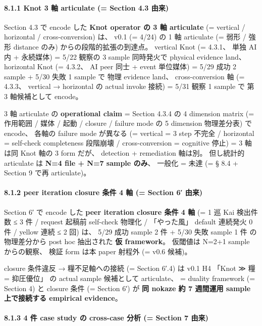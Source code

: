 \documentclass[
]{article}
\begin{document}
\paragraph{8.1.1 Knot 3 軸 articulate (= Section 4.3
由来)}\label{knot-3-ux8ef8-articulate-section-4.3-ux7531ux6765}

Section 4.3 で encode した \textbf{Knot operator の 3 軸 articulate} (=
vertical / horizontal / cross-conversion) は、 v0.1 (= 4/24) の 1 軸
articulate (= 弱形 / 強形 distance のみ) からの段階的拡張の到達点。
vertical Knot (= 4.3.1、 単独 AI 内 + 永続媒体) = 5/22 観察の 3 sample
同時発火で physical evidence land、 horizontal Knot (= 4.3.2、 AI peer
同士 + event 単位媒体) = 5/29 成功 2 sample + 5/30 失敗 1 sample で 物理
evidence land、 cross-conversion 軸 (= 4.3.3、 vertical → horizontal の
actual invoke 接続) = 5/31 観察 1 sample で 第 3 軸候補として encode。

3 軸 articulate の \textbf{operational claim} = Section 4.3.4 の 4
dimension matrix (= 作用範囲 / 媒体 / 起動 / closure / failure mode の 5
dimension 物理差分表) で encode、 各軸の failure mode が異なる (=
vertical = 3 step 不完全 / horizontal = self-check completeness 段階崩壊
/ cross-conversion = cognitive 停止) = 3 軸は同 Knot 軸の 3 form だが、
detection + remediation 軸は別。 但し統計的 articulate は \textbf{N=4
file + N=7 sample のみ}、 一般化 = 未達 (= § 8.4 + Section 9 で再
articulate)。

\paragraph{8.1.2 peer iteration closure 条件 4 軸 (= Section 6′
由来)}\label{peer-iteration-closure-ux6761ux4ef6-4-ux8ef8-section-6-ux7531ux6765}

Section 6′ で encode した \textbf{peer iteration closure 条件 4 軸} (= 1
巡 Kai 検出件数 ≤ 3 件 / request 起稿前 self-check 物理化 / 「やった風」
default 連続発火 0 件 / yellow 連続 ≤ 2 回) は、 5/29 成功 sample 2 件 +
5/30 失敗 sample 1 件 の物理差分から post hoc 抽出された \textbf{仮
framework}。 仮閾値は N=2+1 sample からの観察、 検証 form は本 paper
射程外 (= v0.6 候補)。

closure 条件違反 → 糧不足軸への接続 (= Section 6′.4) は v0.1 H4 「Knot ≫
糧 = 抑圧優位」 の actual sample 候補として articulate、 = duality
framework (= Section 4) と closure 条件 (= Section 6′) が \textbf{同
nokaze 約 7 週間運用 sample 上で接続する empirical evidence}。

\paragraph{8.1.3 4 件 case study の cross-case 分析 (= Section 7
由来)}\label{ux4ef6-case-study-ux306e-cross-case-ux5206ux6790-section-7-ux7531ux6765}
\end{document}
